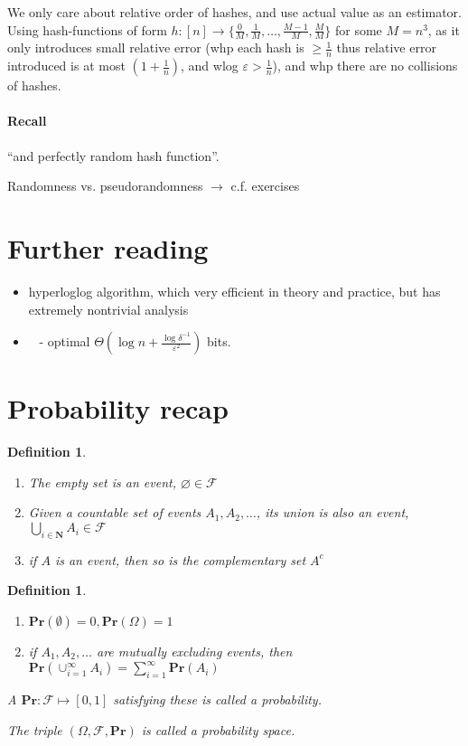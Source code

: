 \documentclass[11pt]{article}
\newcommand{\Ppb}{\mathbf{Pr}}
\newcommand{\sF}{\mathcal{F}}
\newcommand{\Nat}{\mathbf{N}}
\newtheorem{definition}[theorem]{Definition}
\begin{document}
We only care about relative order of hashes, and use actual value as an estimator. Using hash-functions of form $h: [n] \rightarrow \{\frac{0}{M}, \frac{1}{M}, \dots, \frac{M-1}{M}, \frac{M}{M}\}$ for some $M = n^3$, as it only introduces small relative error (whp each hash is $\geq \frac{1}{n}$ thus relative error introduced is at most $(1+\frac{1}{n})$, and wlog $\varepsilon>\frac{1}{n}$), and whp there are no collisions of hashes.

\paragraph{Recall} ``and perfectly random hash function''.

Randomness vs. pseudorandomness $\rightarrow$ c.f. exercises

\section{Further reading}
\begin{itemize}
    \item hyperloglog algorithm, which very efficient in theory and practice, but has extremely nontrivial analysis \cite{DBLP:conf/esa/DurandF03} \cite{DBLP:conf/edbt/HeuleNH13}
    \item\ \cite{DBLP:conf/soda/Blasiok18} - optimal $\Theta(\log{n} + \frac{\log{\delta^{-1}}}{\varepsilon^2})$ bits.

\end{itemize}





\appendix
\section{Probability recap}
\begin{definition}
\begin{enumerate}
    \item The empty set is an event, $\varnothing \in \sF$
    \item Given a countable set of events $A_1, A_2, \dots$, its union is also an event, $\bigcup_{i\in\Nat}A_i \in \sF$
    \item if $A$ is an event, then so is the complementary set $A^c$
\end{enumerate}
\end{definition}

\begin{definition}
\begin{enumerate}
    \item $\Ppb(\emptyset)=0, \Ppb(\Omega)=1$
    \item if $A_1, A_2, \dots$ are mutually excluding events, then $\Ppb\left(\cup_{i=1}^{\infty} A_{i}\right)=\sum_{i=1}^{\infty} \Ppb\left(A_{i}\right)$
\end{enumerate}
A $\Ppb: \mathcal{F} \mapsto[0,1]$ satisfying these is called a probability.

The triple $(\Omega, \mathcal{F}, \Ppb)$ is called a probability space.
\end{definition}
\end{document}
